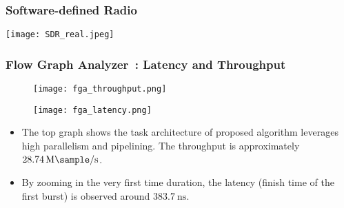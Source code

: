 \begin{frame}
  \end{frame}


  \begin{frame}
    \frametitle{Software-defined Radio}
    \begin{center}
      \texttt{[image: SDR\_real.jpeg]}
    \end{center}

  \end{frame} 


  \begin{frame}
    \frametitle{Flow Graph Analyzer~\cite{Intel_Corporation}: Latency and Throughput}


    \begin{figure}
        \centering
          \texttt{[image: fga\_throughput.png]}
    \end{figure}

    \begin{figure}
      \centering
        \texttt{[image: fga\_latency.png]}
  \end{figure}

    \begin{itemize}
        \item The top graph shows the task architecture of proposed algorithm leverages high parallelism and pipelining. The throughput is approximately 
        $ \SI[per-mode=symbol]{28.74}{\mega\sample\per\second}$.
        \item By zooming in the very first time duration, the latency (finish time of the first burst) is observed around $ \SI[per-mode=symbol]{383.7}{\nano\second}$.

    \end{itemize}
  \end{frame}


